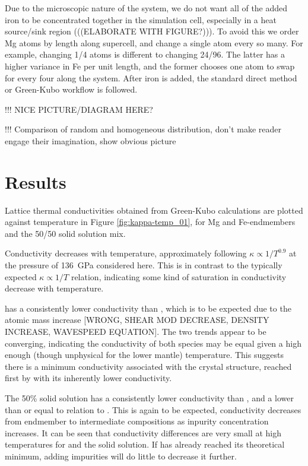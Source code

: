 Due to the microscopic nature of the system, we do not want all of the added iron to be concentrated together in the simulation cell, especially in a heat source/sink region (((ELABORATE WITH FIGURE?))). To avoid this we order Mg atoms by length along supercell, and change a single atom every so many. For example, changing 1/4 atoms is different to changing 24/96. The latter has a higher variance in Fe per unit length, and the former chooses one atom to swap for every four along the system. After iron is added, the standard direct method or Green-Kubo workflow is followed.

!!! NICE PICTURE/DIAGRAM HERE?

!!! Comparison of random and homogeneous distribution, don't make reader engage their imagination, show obvious picture




\section{Results}

Lattice thermal conductivities obtained from Green-Kubo calculations are plotted against temperature in Figure \ref{fig:kappa-temp_01}, for Mg and Fe-endmembers and the 50/50 solid solution mix.

Conductivity decreases with temperature, approximately following $\kappa \propto 1/T^{0.9}$ at the pressure of 136~GPa considered here. This is in contrast to the typically expected $\kappa \propto 1/T$ relation, indicating some kind of saturation in conductivity decrease with temperature.

\fesios has a consistently lower conductivity than \mgsio, which is to be expected due to the atomic mass increase [WRONG, SHEAR MOD DECREASE, DENSITY INCREASE, WAVESPEED EQUATION]. The two trends appear to be converging, indicating the conductivity of both species may be equal given a high enough (though unphysical for the lower mantle) temperature. This suggests there is a minimum conductivity associated with the crystal structure, reached first by \fesios with its inherently lower conductivity.

The 50\% solid solution has a consistently lower conductivity than \mgsio, and a lower than or equal to relation to \fesios. This is again to be expected, conductivity decreases from endmember to intermediate compositions as inpurity concentration increases. It can be seen that conductivity differences are very small at high temperatures for \fesios and the solid solution. If \fesios has already reached its theoretical minimum, adding impurities will do little to decrease it further.

